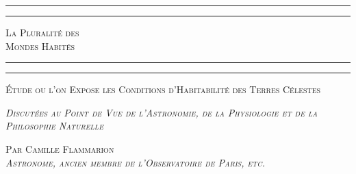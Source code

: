 \documentclass[a4paper, 11pt, oneside]{article}
\begin{document}
\begin{titlepage} %
	\centering %

	
	\rule{\textwidth}{1.6pt}\vspace*{-\baselineskip}\vspace*{2pt} %
	\rule{\textwidth}{0.4pt} %
	
	\vspace{1\baselineskip} %
	
	{\scshape\Huge La Pluralité des \\ Mondes Habités}
	
	\vspace{1\baselineskip} %

	\rule{\textwidth}{0.4pt}\vspace*{-\baselineskip}\vspace{3.2pt} %
	\rule{\textwidth}{1.6pt} %
	
	\vspace{1\baselineskip} %
	
	
	{\scshape \Large Étude ou l'on Expose les Conditions d'Habitabilité des Terres Célestes} %
	
	\vspace*{1\baselineskip} %

        {\scshape \small \emph{Discutées au Point de Vue de l'Astronomie, de la Physiologie et de la Philosophie Naturelle}}

 	\vspace*{1\baselineskip} %

        {\scshape Par \large Camille Flammarion\\\scriptsize \emph{Astronome, ancien membre de l'Observatoire de Paris, etc.}} %
    
 	\vspace{1\baselineskip}


\end{titlepage}
\end{document}
